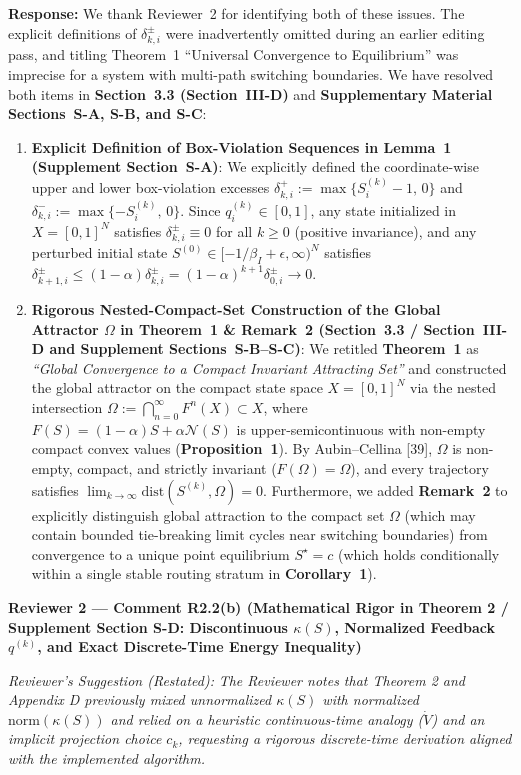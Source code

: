 \documentclass[11pt,a4paper]{article}
\newcommand{\cbox}[2]{%
  \vspace{0.6em}\noindent\textbf{#1}\par\smallskip
  \noindent\textit{Reviewer's Suggestion (Restated):} \textit{#2}\par\smallskip
}
\begin{document}
\noindent\textbf{Response:} We thank Reviewer~2 for identifying both of these issues. The explicit definitions of $\delta^\pm_{k,i}$ were inadvertently omitted during an earlier editing pass, and titling Theorem~1 ``Universal Convergence to Equilibrium'' was imprecise for a system with multi-path switching boundaries. We have resolved both items in \textbf{Section~3.3 (Section~III-D)} and \textbf{Supplementary Material Sections~S-A, S-B, and S-C}:
\begin{enumerate}[leftmargin=1.8em]
    \item \textbf{Explicit Definition of Box-Violation Sequences in Lemma~1 (Supplement Section~S-A)}: We explicitly defined the coordinate-wise upper and lower box-violation excesses $\delta^+_{k,i} := \max\{S_i^{(k)}-1,\, 0\}$ and $\delta^-_{k,i} := \max\{-S_i^{(k)},\, 0\}$. Since $q_i^{(k)} \in [0,1]$, any state initialized in $X=[0,1]^N$ satisfies $\delta^\pm_{k,i} \equiv 0$ for all $k \ge 0$ (positive invariance), and any perturbed initial state $S^{(0)} \in [-1/\beta_I+\epsilon, \infty)^N$ satisfies $\delta^\pm_{k+1,i} \le (1-\alpha)\delta^\pm_{k,i} = (1-\alpha)^{k+1}\delta^\pm_{0,i} \to 0$.
    \item \textbf{Rigorous Nested-Compact-Set Construction of the Global Attractor $\Omega$ in Theorem~1 \& Remark~2 (Section~3.3 / Section~III-D and Supplement Sections~S-B--S-C)}: We retitled \textbf{Theorem~1} as \textit{``Global Convergence to a Compact Invariant Attracting Set''} and constructed the global attractor on the compact state space $X=[0,1]^N$ via the nested intersection $\Omega := \bigcap_{n=0}^{\infty} F^n(X) \subset X$, where $F(S) = (1-\alpha)S + \alpha\mathcal{N}(S)$ is upper-semicontinuous with non-empty compact convex values (\textbf{Proposition~1}). By Aubin--Cellina [39], $\Omega$ is non-empty, compact, and strictly invariant ($F(\Omega)=\Omega$), and every trajectory satisfies $\lim_{k\to\infty}\mathrm{dist}(S^{(k)}, \Omega)=0$. Furthermore, we added \textbf{Remark~2} to explicitly distinguish global attraction to the compact set $\Omega$ (which may contain bounded tie-breaking limit cycles near switching boundaries) from convergence to a unique point equilibrium $S^\star = c$ (which holds conditionally within a single stable routing stratum in \textbf{Corollary~1}).
\end{enumerate}

\hrulefill

\cbox{Reviewer 2 --- Comment R2.2(b) (Mathematical Rigor in Theorem 2 / Supplement Section S-D: Discontinuous $\kappa(S)$, Normalized Feedback $q^{(k)}$, and Exact Discrete-Time Energy Inequality)}{The Reviewer notes that Theorem 2 and Appendix D previously mixed unnormalized $\kappa(S)$ with normalized $\mathrm{norm}(\kappa(S))$ and relied on a heuristic continuous-time analogy ($\dot{V}$) and an implicit projection choice $c_k$, requesting a rigorous discrete-time derivation aligned with the implemented algorithm.}
\end{document}
